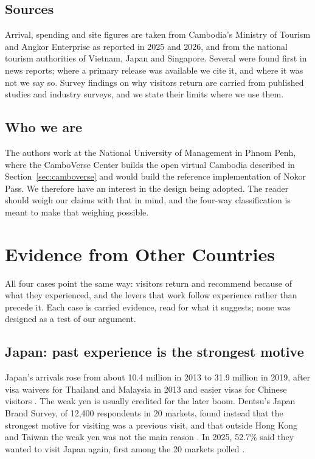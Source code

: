 \documentclass[10pt,letterpaper,twocolumn]{article}
\begin{document}
\subsection{Sources}

Arrival, spending and site figures are taken from Cambodia's Ministry of
Tourism and Angkor Enterprise as reported in 2025 and 2026, and from the
national tourism authorities of Vietnam, Japan and Singapore. Several were
found first in news reports; where a primary release was available we cite it,
and where it was not we say so. Survey findings on why visitors return are
carried from published studies and industry surveys, and we state their limits
where we use them.

\subsection{Who we are}

The authors work at the National University of Management in Phnom Penh, where
the CamboVerse Center builds the open virtual Cambodia described in
Section~\ref{sec:camboverse} and would build the reference implementation of
Nokor Pass. We therefore have an interest in the design being adopted. The
reader should weigh our claims with that in mind, and the four-way
classification is meant to make that weighing possible.

\section{Evidence from Other Countries}
\label{sec:cases}

All four cases point the same way: visitors return and recommend because of
what they experienced, and the levers that work follow experience rather than
precede it. Each case is carried evidence, read for what it suggests; none was
designed as a test of our argument.

\subsection{Japan: past experience is the strongest motive}

Japan's arrivals rose from about 10.4 million in 2013 to 31.9 million in 2019,
after visa waivers for Thailand and Malaysia in 2013 and easier visas for
Chinese visitors \citep{visitinsidejapan2025}. The weak yen is usually credited
for the later boom. Dentsu's Japan Brand Survey, of 12,400 respondents in 20
markets, found instead that the strongest motive for visiting was a previous
visit, and that outside Hong Kong and Taiwan the weak yen was not the main
reason \citep{dentsu2025}. In 2025, 52.7\% said they wanted to visit Japan
again, first among the 20 markets polled \citep{travelvoice2025}.
\end{document}
